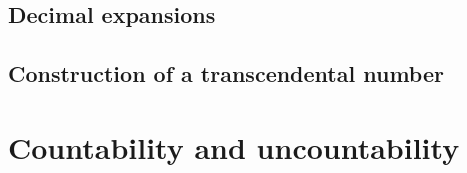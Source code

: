 \documentclass[main.tex]{subfiles}
\begin{document}
		\subsection{Decimal expansions}
			
		\subsection{Construction of a transcendental number}
		
	\section{Countability and uncountability}
		
	
\end{document}
